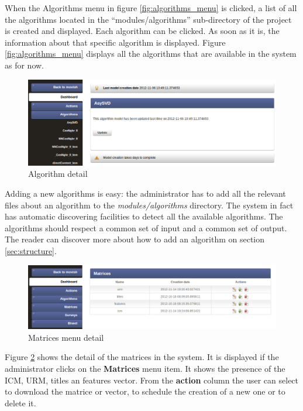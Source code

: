 When the Algorithms menu in figure \ref{fig:algorithms_menu} is clicked, a list of all the algorithms located in the ``modules/algorithms'' sub-directory of the project is created and displayed. Each algorithm can be clicked. As soon as it is, the information about that specific algorithm is displayed. Figure \ref{fig:algorithms_menu} displays all the algorithms that are available in the system as for now. 
\begin{figure}
  \centering
  \includegraphics[width=\textwidth]{figures/algorithm_detail.png}
  \caption{Algorithm detail}
  \label{fig:algorithm_detail}
\end{figure}

Adding a new algorithms is easy: the administrator has to add all the relevant files about an algorithm to the \textit{modules/algorithms} directory. The system in fact has automatic discovering facilities to detect all the available algorithms. The algorithms should respect a common set of input and a common set of output. The reader can discover more about how to add an algorithm on section \ref{sec:structure}.

\begin{figure}
  \centering
  \includegraphics[width=\textwidth]{figures/matrices_detail.png}
  \caption{Matrices menu detail}
  \label{fig:matrice_menu}
\end{figure}

Figure \ref{fig:matrice_menu} shows the detail of the matrices in the system. It is displayed if the administrator clicks on the \textbf{Matrices} menu item. It shows the presence of the \ac{ICM}, \ac{URM}, titles an features vector. From the \textbf{action} column the user can select to download the matrice or vector, to schedule the creation of a new one or to delete it.

